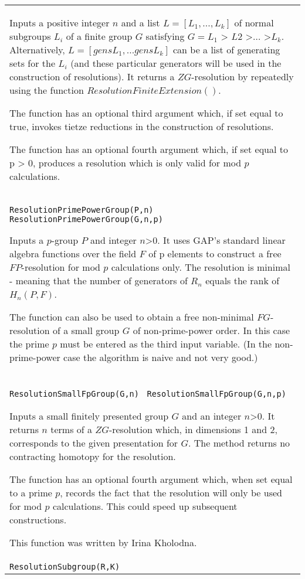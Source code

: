 \documentclass[a4paper,11pt]{report}
\begin{document}
{\begin{center}
\begin{tabular}{|l|}
 Inputs a positive integer $n$ and a list $L = [L_1 , ..., L_k]$ of normal subgroups $L_i$ of a finite group $G$ satisfying $G = L_1$ {\textgreater} $L2$ {\textgreater}$ \ldots $ {\textgreater}$ L_k$. Alternatively, $L = [gensL_1, ... gensL_k]$ can be a list of generating sets for the $L_i$ (and these particular generators will be used in the construction of
resolutions). It returns a $ZG$-resolution by repeatedly using the function $ResolutionFiniteExtension()$.

 The function has an optional third argument which, if set equal to true,
invokes tietze reductions in the construction of resolutions.

 The function has an optional fourth argument which, if set equal to p
{\textgreater} 0, produces a resolution which is only valid for mod $p$ calculations. \\
 \index{ResolutionPrimePowerGroup} \texttt{ResolutionPrimePowerGroup(P,n) } \texttt{ResolutionPrimePowerGroup(G,n,p)} 

 Inputs a $p$-group $P$ and integer $n${\textgreater}$0$. It uses GAP's standard linear algebra functions over the field $F$ of p elements to construct a free $FP$-resolution for mod $p$ calculations only. The resolution is minimal - meaning that the number of
generators of $R_n$ equals the rank of $H_n(P,F)$. 

 The function can also be used to obtain a free non-minimal $FG$-resolution of a small group $G$ of non-prime-power order. In this case the prime $p$ must be entered as the third input variable. (In the non-prime-power case the
algorithm is naive and not very good.) \\
 \index{ResolutionSmallFpGroup} \texttt{ResolutionSmallFpGroup(G,n) } \texttt{ResolutionSmallFpGroup(G,n,p) } 

 Inputs a small finitely presented group $G$ and an integer $n${\textgreater}$0$. It returns $n$ terms of a $ZG$-resolution which, in dimensions 1 and 2, corresponds to the given
presentation for $G$. The method returns no contracting homotopy for the resolution.

 The function has an optional fourth argument which, when set equal to a prime $p$, records the fact that the resolution will only be used for mod $p$ calculations. This could speed up subsequent constructions. 

 This function was written by Irina Kholodna. \\
 \index{ResolutionSubgroup} \texttt{ResolutionSubgroup(R,K)} 


\end{tabular}
\end{center}}
\end{document}
